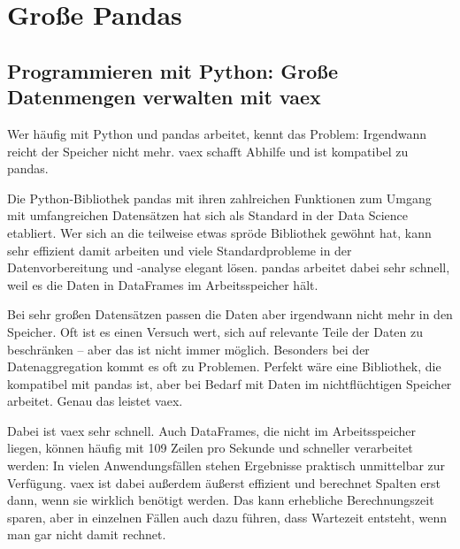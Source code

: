 %
%
%
%



\chapter{Gro{\ss}e Pandas}

\section{Programmieren mit Python: Große Datenmengen verwalten mit vaex}



Wer häufig mit Python und pandas arbeitet, kennt das Problem: Irgendwann reicht der Speicher nicht mehr. vaex schafft Abhilfe und ist kompatibel zu pandas.

Die Python-Bibliothek pandas mit ihren zahlreichen Funktionen zum Umgang mit umfangreichen Datensätzen hat sich als Standard in der Data Science etabliert. Wer sich an die teilweise etwas spröde Bibliothek gewöhnt hat, kann sehr effizient damit arbeiten und viele Standardprobleme in der Datenvorbereitung und -analyse elegant lösen. pandas arbeitet dabei sehr schnell, weil es die Daten in DataFrames im Arbeitsspeicher hält.

Bei sehr großen Datensätzen passen die Daten aber irgendwann nicht mehr in den Speicher. Oft ist es einen Versuch wert, sich auf relevante Teile der Daten zu beschränken – aber das ist nicht immer möglich. Besonders bei der Datenaggregation kommt es oft zu Problemen. Perfekt wäre eine Bibliothek, die kompatibel mit pandas ist, aber bei Bedarf mit Daten im nichtflüchtigen Speicher arbeitet. Genau das leistet vaex.

Dabei ist vaex sehr schnell. Auch DataFrames, die nicht im Arbeitsspeicher liegen, können häufig mit 109 Zeilen pro Sekunde und schneller verarbeitet werden: In vielen Anwendungsfällen stehen Ergebnisse praktisch unmittelbar zur Verfügung. vaex ist dabei außerdem äußerst effizient und berechnet Spalten erst dann, wenn sie wirklich benötigt werden. Das kann erhebliche Berechnungszeit sparen, aber in einzelnen Fällen auch dazu führen, dass Wartezeit entsteht, wenn man gar nicht damit rechnet.

